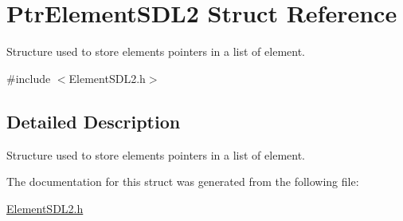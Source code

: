 \hypertarget{structPtrElementSDL2}{}\section{Ptr\+Element\+S\+D\+L2 Struct Reference}
\label{structPtrElementSDL2}


Structure used to store elements\textquotesingle{} pointers in a list of element.  




{\ttfamily \#include $<$Element\+S\+D\+L2.\+h$>$}



\subsection{Detailed Description}
Structure used to store elements\textquotesingle{} pointers in a list of element. 

The documentation for this struct was generated from the following file\+:\begin{DoxyCompactItemize}
\item 
\hyperlink{ElementSDL2_8h}{Element\+S\+D\+L2.\+h}\end{DoxyCompactItemize}
